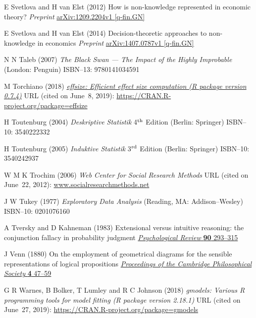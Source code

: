 \begin{thebibliography}{99}
E Svetlova and H van Elst
(2012) How is non-knowledge represented in economic theory?
\textit{Preprint} 
\href{http://arxiv.org/abs/1209.2204}{arXiv:1209.2204v1 [q-fin.GN]}

E Svetlova and H van Elst
(2014) Decision-theoretic approaches to non-knowledge in economics
\textit{Preprint} 
\href{http://arxiv.org/abs/1407.0787}{arXiv:1407.0787v1 [q-fin.GN]}

N N Taleb
(2007) \textit{The Black Swan --- The Impact of the Highly
Improbable} (London: Penguin)
ISBN--13: 9780141034591

M Torchiano
(2018) \href{https://doi.org/10.5281/zenodo.1480624}{\textit{effsize:
Efficient effect size computation (R package version 0.7.4)}}
URL (cited on June~8, 2019): 
\href{https://CRAN.R-project.org/package=effsize}{https://CRAN.R-project.org/package=effsize}

H Toutenburg
(2004) \textit{Deskriptive Statistik}
4$^{\rm th}$ Edition (Berlin: Springer) ISBN--10: 3540222332

H Toutenburg
(2005) \textit{Induktive Statistik}
3$^{\rm rd}$ Edition (Berlin: Springer) ISBN--10: 3540242937

W M K Trochim
(2006) \textit{Web Center for Social Research Methods} URL (cited
on June~22, 2012): \href{http://www.socialresearchmethods.net/}{www.socialresearchmethods.net}

J W Tukey
(1977) \textit{Exploratory Data Analysis}
(Reading, MA: Addison--Wesley)
ISBN--10: 0201076160

A Tversky and D Kahneman
(1983) Extensional versus intuitive reasoning: the conjunction 
fallacy in probability judgment
\href{http://dx.doi.org/10.1037/0033-295X.90.4.293}{\textit{Psychological Review} \textbf{90} 293--315}

J Venn
(1880) On the employment of geometrical diagrams for the sensible 
representations of logical propositions
\href{https://archive.org/stream/proceedingsofcam4188083camb#page/47/mode/1up}{\textit{Proceedings of the Cambridge Philosophical Society}
\textbf{4} 47--59}

G R Warnes, B Bolker, T Lumley and R C Johnson
(2018) \textit{gmodels: Various R programming tools for model
fitting (R package version 2.18.1)} URL (cited on June~27, 2019): 
\href{https://CRAN.R-project.org/package=gmodels}{https://CRAN.R-project.org/package=gmodels}


\end{thebibliography}
